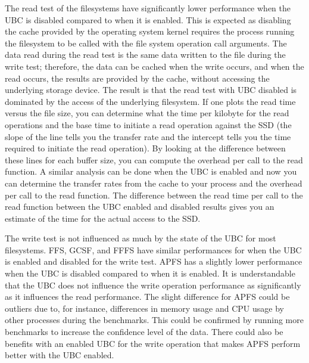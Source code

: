 The read test of the filesystems have significantly lower performance when the \gls{UBC} is disabled compared to when it is enabled. This is expected as disabling the cache provided by the operating system kernel requires the process running the filesystem to be called with the file system operation call arguments. The data read during the read test is the same data written to the file during the write test; therefore, the data can be cached when the write occurs, and when the read occurs, the results are provided by the cache, \ie without accessing the underlying storage device. The result is that the read test with \gls{UBC} disabled is dominated by the access of the underlying filesystem. If one plots the read time versus the file size, you can determine what the time per kilobyte for the read operations and the base time to initiate a read operation against the \gls{SSD} (\ie the slope of the line tells you the transfer rate and the intercept tells you the time required to initiate the read operation). By looking at the difference between these lines for each buffer size, you can compute the overhead per call to the read function. A similar analysis can be done when the \gls{UBC} is enabled and now you can determine the transfer rates from the cache to your process and the overhead per call to the read function. The difference between the read time per call to the read function between the \gls{UBC} enabled and disabled results gives you an estimate of the time for the actual access to the \gls{SSD}.

The write test is not influenced as much by the state of the \gls{UBC} for most filesystems. \gls{FFS}, \gls{GCSF}, and \gls{FFFS} have similar performances for when the \gls{UBC} is enabled and disabled for the write test. \gls{APFS} has a slightly lower performance when the \gls{UBC} is disabled compared to when it is enabled. It is understandable that the \gls{UBC} does not influence the write operation performance as significantly as it influences the read performance. The slight difference for \gls{APFS} could be outliers due to, for instance, differences in memory usage and CPU usage by other processes during the benchmarks. This could be confirmed by running more benchmarks to increase the confidence level of the data. There could also be benefits with an enabled \gls{UBC} for the write operation that makes \gls{APFS} perform better with the \gls{UBC} enabled.

